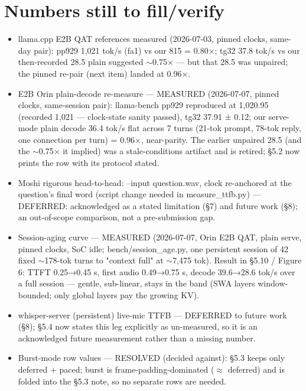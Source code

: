 \documentclass[journal]{IEEEtran}
\begin{document}
\section{Numbers still to fill/verify}
\begin{itemize}
    \item[$\blacksquare$] llama.cpp E2B QAT references measured (2026-07-03, pinned clocks, same-day pair): pp929 1,021 tok/s (fa1) vs our 815 = 0.80×; tg32 37.8 tok/s vs our then-recorded 28.5 plain suggested $\sim$0.75× — but that 28.5 was unpaired; the pinned re-pair (next item) landed at 0.96×.
    \item[$\blacksquare$] E2B Orin plain-decode re-measure — MEASURED (2026-07-07, pinned clocks, same-session pair): llama-bench pp929 reproduced at 1,020.95 (recorded 1,021 — clock-state sanity passed), tg32 37.91 ± 0.12; our serve-mode plain decode 36.4 tok/s flat across 7 turns (21-tok prompt, 78-tok reply, one connection per turn) = 0.96×, near-parity. The earlier unpaired 28.5 (and the $\sim$0.75× it implied) was a stale-conditions artifact and is retired; §5.2 now prints the row with its protocol stated.
    \item[$\square$] Moshi rigorous head-to-head: --input question.wav, clock re-anchored at the question's final word (script change needed in measure\_ttfb.py) — DEFERRED: acknowledged as a stated limitation (§7) and future work (§8); an out-of-scope comparison, not a pre-submission gap.
    \item[$\blacksquare$] Session-aging curve — MEASURED (2026-07-07, Orin E2B QAT, plain serve, pinned clocks, SoC idle; bench/session\_age.py, one persistent session of 42 fixed $\sim$178-tok turns to "context full" at $\sim$7,475 tok). Result in §5.10 / Figure 6: TTFT 0.25→0.45 s, first audio 0.49→0.75 s, decode 39.6→28.6 tok/s over a full session — gentle, sub-linear, stays in the band (SWA layers window-bounded; only global layers pay the growing KV).
    \item[$\square$] whisper-server (persistent) live-mic TTFB — DEFERRED to future work (§8); §5.4 now states this leg explicitly as un-measured, so it is an acknowledged future measurement rather than a missing number.
    \item[$\blacksquare$] Burst-mode row values — RESOLVED (decided against): §5.3 keeps only deferred + paced; burst is frame-padding-dominated ($\approx$ deferred) and is folded into the §5.3 note, so no separate rows are needed.

\end{itemize}
\end{document}

